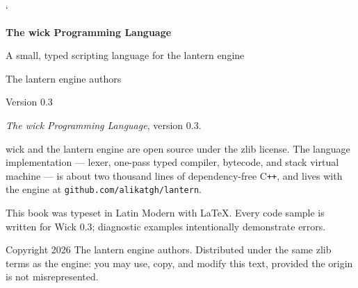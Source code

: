 \documentclass[10pt]{book}
\begin{document}
\lstMakeShortInline[basicstyle=\ttfamily,keywordstyle=\color{wkKeyword}]`

\begin{titlepage}
\centering
\vspace*{1.4in}
{\Huge\bfseries The wick Programming Language\par}
\vspace{1.2em}
{\large A small, typed scripting language for the lantern engine\par}
\vfill
{\large The lantern engine authors\par}
\vspace{0.8em}
{\normalsize Version 0.3 \quad\textbullet{}\par}
\vspace{1.2in}
\end{titlepage}

\thispagestyle{empty}
\null\vfill
\noindent
\textit{The wick Programming Language}, version 0.3.\par
\vspace{0.6em}
\noindent
wick and the lantern engine are open source under the zlib license. The
language implementation --- lexer, one-pass typed compiler, bytecode, and
stack virtual machine --- is about two thousand lines of dependency-free
\mbox{C\texttt{++}}, and lives with the engine at
\texttt{github.com/alikatgh/lantern}.\par
\vspace{0.6em}
\noindent
This book was typeset in Latin Modern with \LaTeX. Every code sample is
written for Wick 0.3; diagnostic examples intentionally demonstrate errors.\par
\vspace{0.6em}
\noindent
Copyright \textcopyright{} 2026 The lantern engine authors. Distributed
under the same zlib terms as the engine: you may use, copy, and modify this
text, provided the origin is not misrepresented.\par
\vfill

\frontmatter
\tableofcontents

\mainmatter










\appendix

\end{document}
